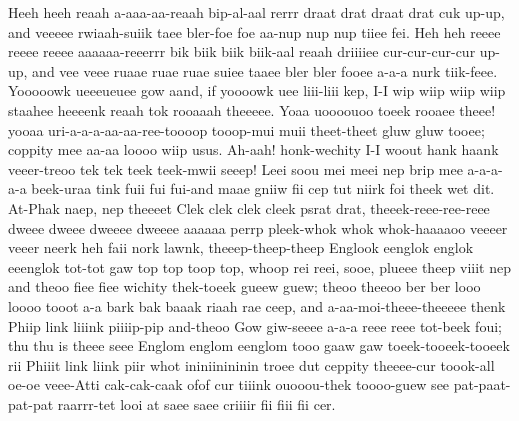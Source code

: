 \documentclass[12pt,a4paper]{article}
\begin{document}
\begin{drama}
\pistspeaks
Heeh heeh reaah a-aaa-aa-reaah bip-al-aal rerrr draat drat draat drat cuk up-up, and veeeee rwiaah-suiik taee bler-foe foe aa-nup nup nup tiiee fei. Heh heh reeee reeee reeee aaaaaa-reeerrr bik biik biik biik-aal reaah driiiiee cur-cur-cur-cur up-up, and vee veee ruaae ruae ruae suiee taaee bler bler fooee a-a-a nurk tiik-feee.
\heraspeaks
Yooooowk ueeeueuee gow aand, if yoooowk uee liii-liii kep, I-I wip wiip wiip wiip staahee heeeenk reaah tok rooaaah theeeee.
\pistspeaks
Yoaa uoooouoo toeek rooaee theee! yooaa uri-a-a-a-aa-aa-ree-toooop tooop-mui muii theet-theet gluw gluw tooee; coppity mee aa-aa loooo wiip usus.
\heraspeaks
Ah-aah! honk-wechity I-I woout hank haank veeer-treoo tek tek teek teek-mwii seeep!
\pistspeaks
Leei soou mei meei nep brip mee a-a-a-a-a beek-uraa tink fuii fui fui-and maae gniiw fii cep tut niirk foi theek wet dit.
\chorspeaks
At-Phak naep, nep theeeet Clek clek clek cleek psrat drat, theeek-reee-ree-reee dweee dweee dweeee dweeee aaaaaa perrp pleek-whok whok whok-haaaaoo veeeer veeer neerk heh faii nork lawnk, theeep-theep-theep Englook eenglok englok eeenglok tot-tot gaw top top toop top, whoop rei reei, sooe, plueee theep viiit nep and theoo fiee fiee wichity thek-toeek gueew guew; theoo theeoo ber ber looo loooo tooot a-a bark bak baaak riaah rae ceep, and a-aa-moi-theee-theeeee thenk Phiip link liiink piiiip-pip and-theoo Gow giw-seeee a-a-a reee reee tot-beek foui; thu thu is theee seee Englom englom eenglom tooo gaaw gaw toeek-tooeek-tooeek rii Phiiit link liink piir whot ininiinininin troee dut ceppity theeee-cur toook-all oe-oe veee-Atti cak-cak-caak ofof cur tiiink ouooou-thek toooo-guew see pat-paat-pat-pat raarrr-tet looi at saee saee criiiir fii fiii fii cer.
\amesspeaks

\end{drama}
\end{document}
